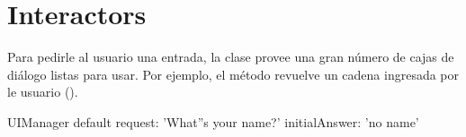\documentclass[a4paper,10pt,twoside]{book}
\begin{document}

\section{Interactors}

Para pedirle al usuario una entrada, la clase  provee una gran n\'umero de  cajas de di\'alogo listas para usar.
Por ejemplo, el m\'etodo  revuelve un cadena ingresada por le usuario ().

\begin{code}{}
UIManager default request: 'What''s your name?' initialAnswer: 'no name'
\end{code}
\end{document}
